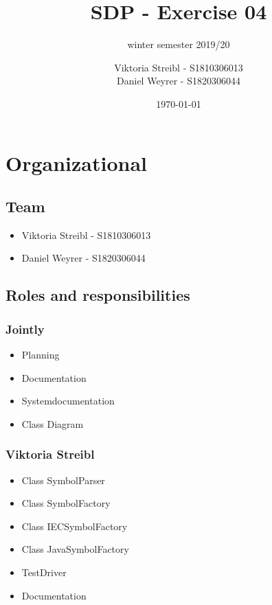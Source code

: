 

\graphicspath{{./}}



\title{SDP - Exercise 04} %
\subtitle{winter semester 2019/20} %
\author{
Viktoria Streibl - S1810306013\\
  Daniel Weyrer - S1820306044
} %
\date{\today} %

\maketitle %

\newpage
\tableofcontents %
\newpage


\section{Organizational}
\subsection{Team}
\begin{itemize}
	\item Viktoria 	Streibl 		- 	S1810306013
	\item Daniel 	Weyrer		-	S1820306044
\end{itemize}

\subsection{Roles and responsibilities}
\subsubsection{Jointly}
\begin{itemize}
	\item Planning
	\item Documentation
	\item Systemdocumentation
	\item Class Diagram
\end{itemize}

\subsubsection{Viktoria Streibl}
\begin{itemize}
	\item Class SymbolParser
	\item Class SymbolFactory
	\item Class IECSymbolFactory
	\item Class JavaSymbolFactory
	
	\item TestDriver	
	
	\item Documentation	
\end{itemize}

